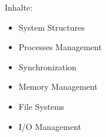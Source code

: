 \begin{module}
\begin{learningoutcomes}
\end{learningoutcomes}

\begin{content}
Inhalte:

 \begin{itemize}\item System Structures  \item Processes Management  \item Synchronization  \item Memory Management  \item File Systems  \item I/O Management  \end{itemize}
\end{content}



\end{module}

